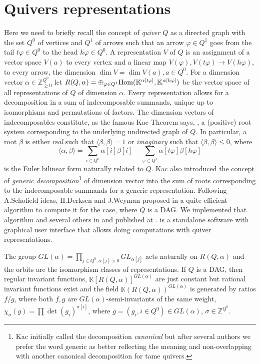 \documentclass[reqno]{amsart}
\theoremstyle{plain}
\theoremstyle{definition}
\theoremstyle{remark}
\begin{document}
\section{Quivers representations}
Here we need to briefly recall the concept of {\it quiver} $Q$ as a directed graph with the set $Q^0$ of vertices and $Q^1$ of arrows such that an arrow $\varphi\in Q^1$ goes from the tail $t\varphi\in Q^0$ to the head $h\varphi\in Q^0$. A representation $V$ of $Q$ is an assignment of a vector space $V(a)$ to every vertex and a linear map $V(\varphi),V(t\varphi)\to V(h\varphi)$, to every arrow, the dimension $\dim V=\dim V(a),a\in Q^0$.
For a dimension  vector $\alpha\in {\mathbb Z}_{\geq 0}^{Q^0}$ let  $R(Q,\alpha)=\oplus_{\varphi\in Q^1} {\rm Hom} ({\mathbb K}^{\alpha[t\varphi]},{\mathbb K}^{\alpha[h\varphi]})$ be the vector space of all representations of $Q$ of dimension $\alpha$. Every representation allows for a decomposition in a sum of indecomposable summands, unique up to isomorphisms and permutations of factors. The dimension vectors of indecomposables constitute, as the famous Kac Theorem says, \cite{kac}, a (positive) root system corresponding to the underlying undirected graph of $Q$. In particular, a root $\beta$ is either {\it real} such that $\langle \beta,\beta\rangle=1$ or {\it imaginary} such that $\langle \beta,\beta\rangle\leq 0$, where
\begin{equation}\label{euler}
\langle \alpha,\beta\rangle= \sum_{i\in Q^0} \alpha[i]\beta[i] - \sum_{\varphi\in Q^1} \alpha[t\varphi]\beta[h\varphi]
\end{equation}
is the Euler bilinear form naturally related to $Q$. Kac also introduced the concept of {\it generic decomposition}\footnote{Kac initially called the decomposition {\it canonical} but after several authors we prefer the word generic as better reflecting the meaning and non-overlapping with another canonical decomposition for tame quivers.} of dimension vector into the sum of roots corresponding to the indecomposable summands for a generic representation.  Following A.Schofield ideas, H.Derksen and J.Weyman proposed in \cite{dw} a quite efficient algorithm to compute it for the case, where $Q$ is a DAG. We implemented that algorithm and several others in \cite{t} and published at \cite{sh09}. \cite{t} is a standalone software with graphical user interface that allows doing computations with quiver representations.


The group $GL(\alpha)=\prod_{j\in Q^0,\alpha[j]>0}GL_{\alpha[j]}$ acts naturally on $R(Q,\alpha)$ and the orbits are the isomorphism classes of representations. If $Q$ is a DAG, then regular invariant functions, ${\mathbb K}[R(Q,\alpha)]^{GL(\alpha)}$ are just constant but rational invariant functions exist and the field ${\mathbb K}(R(Q,\alpha))^{GL(\alpha)}$ is generated by ratios $f/g$, where both $f,g$ are $GL(\alpha)$-semi-invariants of the same weight, $\chi_{\sigma}(g)=\prod\det(g_i)^{\sigma[i]}$, where $g=(g_i,i\in Q^0)\in GL(\alpha)$, $\sigma\in {\mathbb Z}^{Q^0}$.
\end{document}
